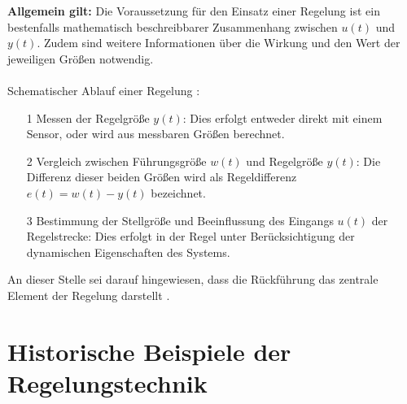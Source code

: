%
\textbf{Allgemein gilt:} Die Voraussetzung für den Einsatz einer Regelung ist ein bestenfalls mathematisch beschreibbarer Zusammenhang zwischen $u(t)$ und $y(t)$. Zudem sind weitere Informationen über die Wirkung und den Wert der jeweiligen Größen notwendig.\\\\
%
Schematischer Ablauf einer Regelung \cite{Lunze10}:
\begin{itemize}
	\item[1] Messen der Regelgröße $y(t)$: Dies erfolgt entweder direkt mit einem Sensor, oder wird aus messbaren Größen berechnet.
	\item[2] Vergleich zwischen Führungsgröße $w(t)$ und Regelgröße $y(t)$: Die Differenz dieser beiden Größen wird als Regeldifferenz $e(t)=w(t)-y(t)$ bezeichnet.  
	\item[3] Bestimmung der Stellgröße und Beeinflussung des Eingangs $u(t)$ der Regelstrecke: Dies erfolgt in der Regel unter Berücksichtigung der dynamischen Eigenschaften des Systems. 
\end{itemize}
%
An dieser Stelle sei darauf hingewiesen, dass die Rückführung das zentrale Element der Regelung darstellt \cite{Lunze10}.
%
\section{Historische Beispiele der Regelungstechnik}
%
